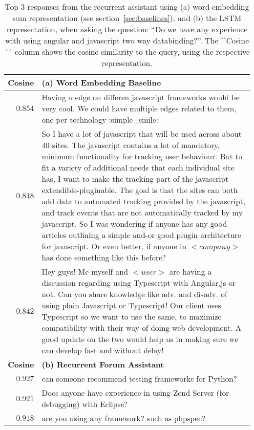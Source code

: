 \documentclass[11pt]{article}
\begin{document}
\begin{table*}[h]
\centering
\begin{tabularx}{\linewidth}{rX}
\textbf{Cosine} & \textbf{(a) Word Embedding Baseline} \\
\midrule
$0.854$ & Having a edge on differen javascript frameworks would be very cool. We could have multiple edges related to them, one per technology :simple\_smile: \\
$0.848$ & So I have a lot of javascript that will be used across about $40$ sites. The javascript contains a lot of mandatory, minimum functionality for tracking user behaviour. But to fit a variety of additional needs that each individual site has, I want to make the tracking part of the javascript extendible-pluginable. The goal is that the sites can both add data to automated tracking provided by the javascript, and track events that are not automatically tracked by my javascript. So I was wondering if anyone has any good articles outlining a simple and-or good plugin architecture for javascript. Or even better, if anyone in $<company>$ has done something like this before? \\
$0.842$ & Hey guys! Me myself and $<user>$ are having a discussion regarding using Typescript with Angular.js or not. Can you share knowledge like adv. and disadv. of using plain Javascript or Typescript! Our client uses Typescript so we want to use the same, to maximize compatibility with their way of doing web development. A good update on the two would help us in making sure we can develop fast and without delay! \vspace{1em} \\

\textbf{Cosine} & \textbf{(b) Recurrent Forum Assistant} \\

\midrule

$0.927$ & can someone recommend testing frameworks for Python? \\
$0.921$ & Does anyone have experience in using Zend Server (for debugging) with Eclipse? \\
$0.918$ & are you using any framework? such as phpspec?
\end{tabularx}
\caption{Top 3 responses from the recurrent assistant using (a) word-embedding sum representation (see section~\ref{sec:baselines}), and (b) the LSTM representation, when asking the question: ``Do we have any experience with using angular and javascript two way databinding?''. The ˋˋCosine´´ column shows the cosine similarity to the query, using the respective representation.
\vspace{.5em}
}
\label{tab:post-recommendation-examples-complete}
\end{table*}
\end{document}
